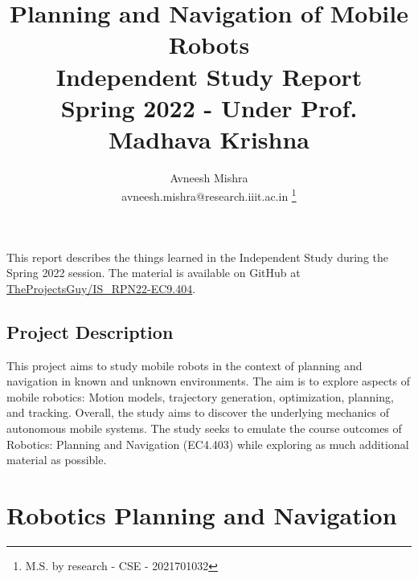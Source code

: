 


{
   \fancyhf{}
   \renewcommand{\headrulewidth}{0pt} %
}

\title{Planning and Navigation of Mobile Robots \\
    \Large Independent Study Report \\
    \small Spring 2022 - Under Prof. Madhava Krishna
}

\author{Avneesh Mishra \\
    avneesh.mishra@research.iiit.ac.in
    \thanks{M.S. by research - CSE - 2021701032}}


    \maketitle
    \thispagestyle{fancy_tr_rno}
    
    This report describes the things learned in the Independent Study during the Spring 2022 session. The material is available on GitHub at \href{https://github.com/TheProjectsGuy/IS_RPN22-EC9.404}{TheProjectsGuy/IS\_RPN22-EC9.404}.

    \subsection*{Project Description}
    This project aims to study mobile robots in the context of planning and navigation in known and unknown environments. The aim is to explore aspects of mobile robotics: Motion models, trajectory generation, optimization, planning, and tracking. Overall, the study aims to discover the underlying mechanics of autonomous mobile systems. The study seeks to emulate the course outcomes of Robotics: Planning and Navigation (EC4.403) while exploring as much additional material as possible.

    \tableofcontents
    \pagebreak
    \listoffigures

    \pagebreak
    
    \pagebreak
    
    \pagebreak
    \section{Robotics Planning and Navigation}
    \label{sec:rpn-assignments}
    
    \pagebreak
    
    \pagebreak
    

    \pagebreak
    \printbibliography


